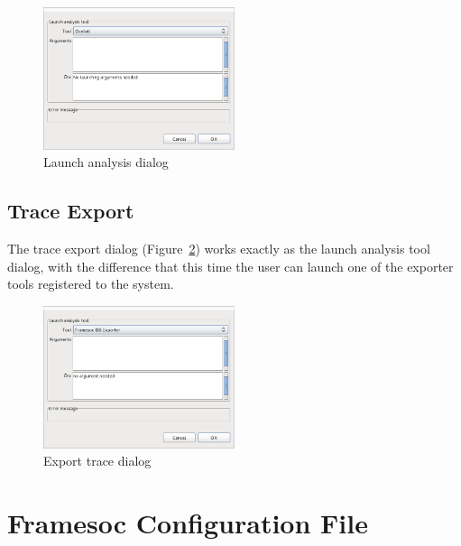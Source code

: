 \documentclass[twoside]{article}
\begin{document}
\begin{sloppypar}
\begin{figure}[h!]
  \centering
    \includegraphics[width=0.5\textwidth]{images/analysis_dialog.png}
  \caption{Launch analysis dialog}
  \label{fig:analysis_dialog}
\end{figure}

\subsection{Trace Export }
\label{subsec:export}

The  trace export dialog (Figure~\ref{fig:export_dialog}) works exactly as the launch analysis tool dialog, with the difference that this time the user can launch one of the exporter tools registered to the system.

\begin{figure}[h!]
  \centering
    \includegraphics[width=0.5\textwidth]{images/export_dialog.png}
  \caption{Export trace dialog}
  \label{fig:export_dialog}
\end{figure}

\newpage

\appendix

\section{Framesoc Configuration File}
\label{app:conf}


\end{sloppypar}
\end{document}
